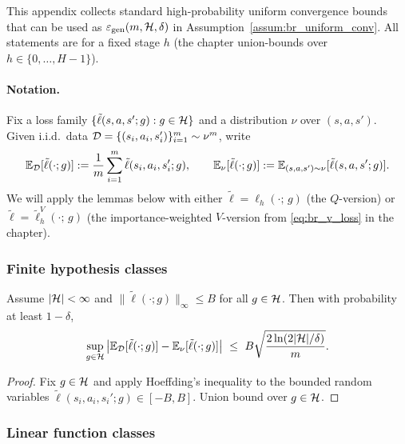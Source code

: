 This appendix collects standard high-probability uniform convergence bounds that can be used as
$\varepsilon_{\mathrm{gen}}(m,\mathcal{H},\delta)$ in Assumption~\ref{assum:br_uniform_conv}.
All statements are for a fixed stage $h$ (the chapter union-bounds over $h\in\{0,\dots,H-1\}$).

\paragraph{Notation.}
Fix a loss family $\{\tilde{\ell}(s,a,s';g):g\in\mathcal{H}\}$ and a distribution $\nu$ over $(s,a,s')$.
Given i.i.d.\ data $\mathcal{D}=\{(s_i,a_i,s_i')\}_{i=1}^m\sim \nu^m$, write
\[
\mathbb{E}_{\mathcal{D}}[\tilde{\ell}(\cdot;g)] := \frac{1}{m}\sum_{i=1}^m \tilde{\ell}(s_i,a_i,s_i';g),
\qquad
\mathbb{E}_{\nu}[\tilde{\ell}(\cdot;g)] := \mathbb{E}_{(s,a,s')\sim\nu}[\tilde{\ell}(s,a,s';g)].
\]
We will apply the lemmas below with either
$\tilde{\ell}=\ell_h(\cdot;\,g)$ (the $Q$-version) or
$\tilde{\ell}=\tilde{\ell}_h^{V}(\cdot;\,g)$ (the importance-weighted $V$-version from
\eqref{eq:br_v_loss} in the chapter).

\subsubsection{Finite hypothesis classes}

\begin{lemma}
\label{lem:br_epsgen_finite}
Assume $|\mathcal{H}|<\infty$ and $\|\tilde{\ell}(\cdot;g)\|_\infty\le B$ for all $g\in\mathcal{H}$.
Then with probability at least $1-\delta$,
\[
\sup_{g\in\mathcal{H}}\big|\mathbb{E}_{\mathcal{D}}[\tilde{\ell}(\cdot;g)]-\mathbb{E}_{\nu}[\tilde{\ell}(\cdot;g)]\big|
\ \le\
B\sqrt{\frac{2\ln(2|\mathcal{H}|/\delta)}{m}}.
\]
\end{lemma}

\begin{proof}
Fix $g\in\mathcal{H}$ and apply Hoeffding's inequality to the bounded random variables
$\tilde{\ell}(s_i,a_i,s_i';g)\in[-B,B]$. Union bound over $g\in\mathcal{H}$.
\end{proof}

\subsubsection{Linear function classes}

